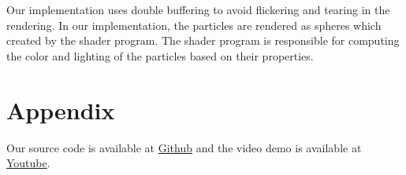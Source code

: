 \documentclass[a4paper]{article}
\begin{document}
Our implementation uses double buffering to avoid flickering and tearing in the rendering.
In our implementation, the particles are rendered as spheres which created by the shader program.
The shader program is responsible for computing the color and lighting of the particles based on their properties.

\nocite{*}
\printbibliography

\pagebreak
\section*{Appendix}

Our source code is available at \href{https://github.com/MasterIceZ/SPH-FluidSimulation}{Github} and the video demo is available at \href{}{Youtube}.
\end{document}
